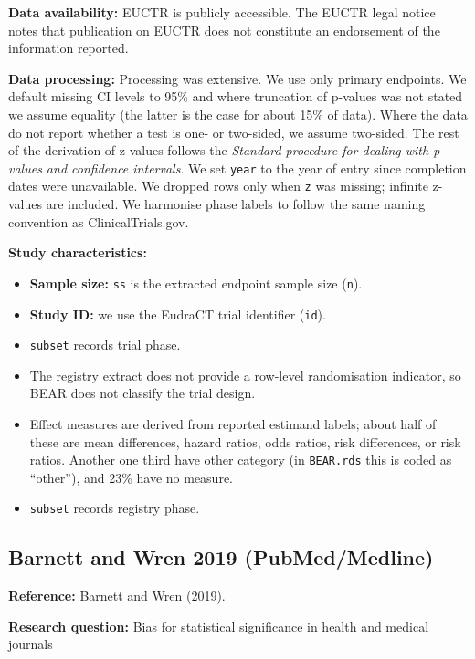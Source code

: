 \documentclass[
  11pt,
]{article}
\begin{document}
\textbf{Data availability:} EUCTR is publicly accessible. The EUCTR
legal notice notes that publication on EUCTR does not constitute an
endorsement of the information reported.

\textbf{Data processing:} Processing was extensive. We use only primary
endpoints. We default missing CI levels to 95\% and where truncation of
p-values was not stated we assume equality (the latter is the case for
about 15\% of data). Where the data do not report whether a test is one-
or two-sided, we assume two-sided. The rest of the derivation of
z-values follows the \emph{Standard procedure for dealing with p-values
and confidence intervals}. We set \texttt{year} to the year of entry
since completion dates were unavailable. We dropped rows only when
\texttt{z} was missing; infinite z-values are included. We harmonise
phase labels to follow the same naming convention as ClinicalTrials.gov.

\textbf{Study characteristics:}

\begin{itemize}
\item
  \textbf{Sample size:} \texttt{ss} is the extracted endpoint sample
  size (\texttt{n}).
\item
  \textbf{Study ID:} we use the EudraCT trial identifier (\texttt{id}).
\item
  \texttt{subset} records trial phase.
\item
  The registry extract does not provide a row-level randomisation
  indicator, so BEAR does not classify the trial design.
\item
  Effect measures are derived from reported estimand labels; about half
  of these are mean differences, hazard ratios, odds ratios, risk
  differences, or risk ratios. Another one third have other category (in
  \texttt{BEAR.rds} this is coded as ``other''), and 23\% have no
  measure.
\item
  \texttt{subset} records registry phase.
\end{itemize}

\newpage

\subsection{Barnett and Wren 2019
(PubMed/Medline)}\label{barnett-and-wren-2019-pubmedmedline}

\textbf{Reference:} Barnett and Wren (2019).

\textbf{Research question:} Bias for statistical significance in health
and medical journals
\end{document}
